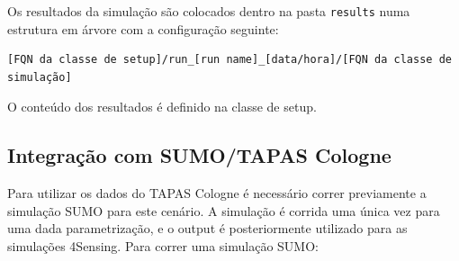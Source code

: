 \documentclass{article}
\newcommand{\tm}[1]{\texttt{#1}}
\begin{document}
Os resultados da simulação são colocados dentro na pasta \tm{results} numa estrutura em árvore com a configuração seguinte:

\begin{Verbatim}
[FQN da classe de setup]/run_[run name]_[data/hora]/[FQN da classe de simulação]
\end{Verbatim}

O conteúdo dos resultados é definido na classe de setup.

\subsection{Integração com SUMO/TAPAS Cologne}\label{sec:sumo-tapas}
Para utilizar os dados do TAPAS Cologne é necessário correr previamente a simulação SUMO para este cenário. A simulação é corrida uma única vez para uma dada parametrização, e o output é posteriormente utilizado para as simulações 4Sensing. Para correr uma simulação SUMO:
\end{document}
